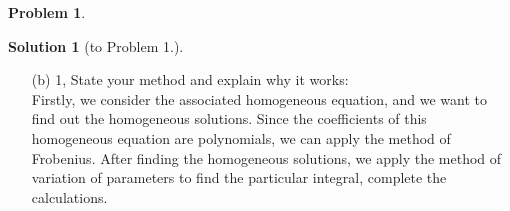 \documentclass[a4paper]{article}
\theoremstyle{definition}
\newtheorem{Problem}{Problem}
\newtheorem*{Solution}{Solution}
\begin{document}
\begin{Problem}
\begin{Solution}[to Problem 1.]
\begin{itemize}
\begin{align}
\begin{aligned}
c_1' &=-x^{\frac{5}{2}}\\
c_2' &=x^{\frac{3}{2}}
\end{aligned}\right.
\end{align}
Integrating yields
\begin{align}
    \left\{\begin{aligned}
    c_1 &=-\frac{2}{7}x^{\frac{7}{2}}+A\\
    c_2 &=\frac{2}{5}x^{\frac{5}{2}}+B
    \end{aligned}\right.
\end{align}
where $A$ and $B$ are constant.
Therefore, the general solution is 
\begin{align}
    y(x) &=c_1u_1+c_2u_2\\
    &=\left(-\frac{2}{7}x^{\frac{7}{2}}+A\right)e^{x}+\left(\frac{2}{5}x^{\frac{5}{2}}+B\right)xe^{x}\\
    &=Ae^{x}+Bxe^{x}+\left(
        -\frac{2}{7}x^{\frac{7}{2}}+\frac{2}{5}x^{\frac{7}{2}}
    \right)e^{x}\\
    &=Ae^{x}+Bxe^{x}+\frac{4}{35}x^{\frac{7}{2}}e^{x},
\end{align}


\item[(b)]
1, State your method and explain why it works:\\
Firstly, we consider the associated homogeneous equation, and we want to find out the homogeneous solutions. 
Since the coefficients of this homogeneous equation are polynomials, we can apply the method of Frobenius. 
After finding the homogeneous solutions, we apply the method of variation of parameters to find the particular integral, complete the calculations.


\end{itemize}
\end{Solution}
\end{Problem}
\end{document}
